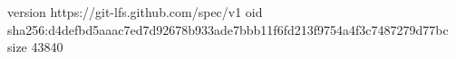 version https://git-lfs.github.com/spec/v1
oid sha256:d4defbd5aaac7ed7d92678b933ade7bbb11f6fd213f9754a4f3c7487279d77bc
size 43840
